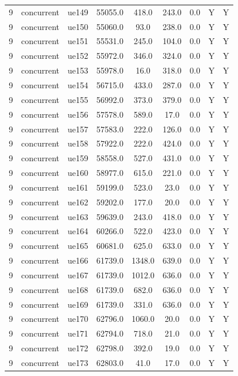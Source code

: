 \begin{table}[ht]
\begin{tabular}{|c|c|c|c|c|c|c|c|c|}
9 & concurrent & ue149 & 55055.0 & 418.0 & 243.0 & 0.0 & Y & Y \\
9 & concurrent & ue150 & 55060.0 & 93.0 & 238.0 & 0.0 & Y & Y \\
9 & concurrent & ue151 & 55531.0 & 245.0 & 104.0 & 0.0 & Y & Y \\
9 & concurrent & ue152 & 55972.0 & 346.0 & 324.0 & 0.0 & Y & Y \\
9 & concurrent & ue153 & 55978.0 & 16.0 & 318.0 & 0.0 & Y & Y \\
9 & concurrent & ue154 & 56715.0 & 433.0 & 287.0 & 0.0 & Y & Y \\
9 & concurrent & ue155 & 56992.0 & 373.0 & 379.0 & 0.0 & Y & Y \\
9 & concurrent & ue156 & 57578.0 & 589.0 & 17.0 & 0.0 & Y & Y \\
9 & concurrent & ue157 & 57583.0 & 222.0 & 126.0 & 0.0 & Y & Y \\
9 & concurrent & ue158 & 57922.0 & 222.0 & 424.0 & 0.0 & Y & Y \\
9 & concurrent & ue159 & 58558.0 & 527.0 & 431.0 & 0.0 & Y & Y \\
9 & concurrent & ue160 & 58977.0 & 615.0 & 221.0 & 0.0 & Y & Y \\
9 & concurrent & ue161 & 59199.0 & 523.0 & 23.0 & 0.0 & Y & Y \\
9 & concurrent & ue162 & 59202.0 & 177.0 & 20.0 & 0.0 & Y & Y \\
9 & concurrent & ue163 & 59639.0 & 243.0 & 418.0 & 0.0 & Y & Y \\
9 & concurrent & ue164 & 60266.0 & 522.0 & 423.0 & 0.0 & Y & Y \\
9 & concurrent & ue165 & 60681.0 & 625.0 & 633.0 & 0.0 & Y & Y \\
9 & concurrent & ue166 & 61739.0 & 1348.0 & 639.0 & 0.0 & Y & Y \\
9 & concurrent & ue167 & 61739.0 & 1012.0 & 636.0 & 0.0 & Y & Y \\
9 & concurrent & ue168 & 61739.0 & 682.0 & 636.0 & 0.0 & Y & Y \\
9 & concurrent & ue169 & 61739.0 & 331.0 & 636.0 & 0.0 & Y & Y \\
9 & concurrent & ue170 & 62796.0 & 1060.0 & 20.0 & 0.0 & Y & Y \\
9 & concurrent & ue171 & 62794.0 & 718.0 & 21.0 & 0.0 & Y & Y \\
9 & concurrent & ue172 & 62798.0 & 392.0 & 19.0 & 0.0 & Y & Y \\
9 & concurrent & ue173 & 62803.0 & 41.0 & 17.0 & 0.0 & Y & Y \\

\end{tabular}
\end{table}
